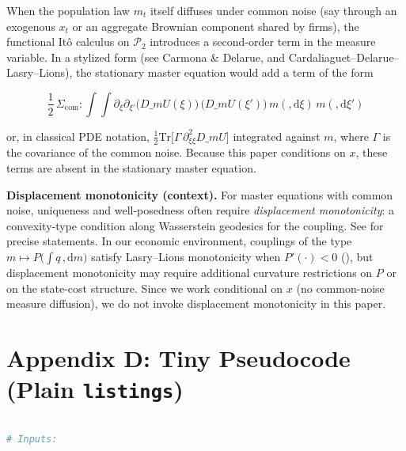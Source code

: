 ﻿\documentclass[11pt,letterpaper,oneside]{article}
\numberwithin{equation}{section}
\newcommand{\1}{\mathbf{1}}
\newcommand{\diff}{,\mathrm{d}}
\newcommand{\dmU}{D\_m U}
\newcommand{\Dm}{D\_m}
\begin{document}
\begin{tcolorbox}[didacticstyle]
\begin{itemize}[leftmargin=1.1em,itemsep=0.25em]
When the population law $m_t$ itself diffuses under common noise (say through an exogenous $x_t$ or an aggregate Brownian component shared by firms), the functional Itô calculus on $\mathcal P_2$ introduces a second-order term in the measure variable. In a stylized form (see Carmona \& Delarue, and Cardaliaguet--Delarue--Lasry--Lions), the stationary master equation would add a term of the form

$$
\frac{1}{2}\,\Sigma_{\mathrm{com}}:\!\int\!\!\int
\partial_{\xi}\partial_{\xi'} \big(\Dm U(\xi)\big)\,\big(\Dm U(\xi')\big)
\, m(\diff \xi)\, m(\diff \xi')
$$

or, in classical PDE notation,
$\tfrac12 \mathrm{Tr}\big[\Gamma\,\partial_{\xi\xi}^2 \dmU\big]$
integrated against $m$, where $\Gamma$ is the covariance of the common noise. Because this paper conditions on $x$, these terms are absent in the stationary master equation.

\begin{tcolorbox}[mathstyle]
\textbf{Displacement monotonicity (context).}
For master equations with common noise, uniqueness and well-posedness often require \emph{displacement monotonicity}: a convexity-type condition along Wasserstein geodesics for the coupling. See \cite{cardaliaguet_delarue_lasry_lions_2019} for precise statements. In our economic environment, couplings of the type $m\mapsto P\!\big(\int q\,\diff m\big)$ satisfy Lasry--Lions monotonicity when $P'(\cdot)<0$ (), but displacement monotonicity may require additional curvature restrictions on $P$ or on the state-cost structure. Since we work conditional on $x$ (no common-noise measure diffusion), we do not invoke displacement monotonicity in this paper.
\end{tcolorbox}

\section{Appendix D: Tiny Pseudocode (Plain \texorpdfstring{\texttt{listings}}{listings})}\label{app:code}

\lstset{
basicstyle=\ttfamily\small,
columns=fullflexible,
showstringspaces=false,
frame=single,
framerule=0.4pt,
breaklines=true,
tabsize=2,
captionpos=b
}

\begin{lstlisting}[language=Python,caption={Pseudo-JAX for (ME) residual with empirical measure}]

# Inputs:


\end{lstlisting}
\end{itemize}
\end{tcolorbox}
\end{document}
